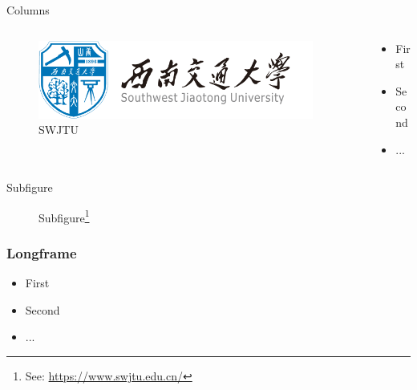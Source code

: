 \documentclass[11pt]{SWJTUBeamer}
\begin{document}
\begin{frame}{Columns}
    \begin{columns}
        \begin{column}{0.3\textwidth}
            \begin{figure}
                \centering
                \includegraphics[width=0.95\textwidth]{swjtu_logo.png}
                \caption{SWJTU}\label{fig:SWJTU}
            \end{figure}
        \end{column}
        \begin{column}{0.7\textwidth}
            \begin{itemize}
                \item First
                \item Second
                \item ...
            \end{itemize}
        \end{column}
    \end{columns}
\end{frame}

\begin{frame}{Subfigure}
    \begin{figure}
        \centering
        \caption{Subfigure\footnote{See: \url{https://www.swjtu.edu.cn/}}}\label{fig:subfig}
    \end{figure}
\end{frame}

\begin{frame}[allowframebreaks]
    \frametitle{Longframe}
    \begin{itemize}
        \item First
        \item Second
        \item ...
\end{itemize}
\end{frame}
\end{document}
